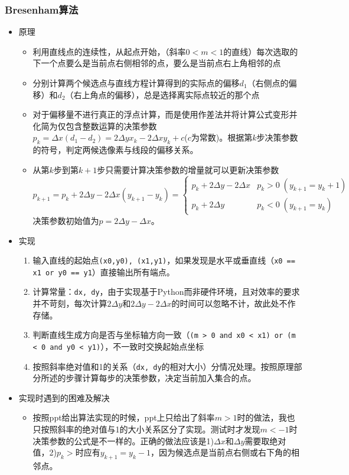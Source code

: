 \documentclass[a4paper,UTF8]{article}
\theoremstyle{definition}
\begin{document}
\subsubsection{Bresenham算法}
\begin{itemize}
  \item 原理
  \begin{itemize}
    \item 利用直线点的连续性，从起点开始，（斜率$0<m<1$的直线）每次选取的下一个点要么是当前点右侧相邻的点，要么是当前点右上角相邻的点
    \item 分别计算两个候选点与直线方程计算得到的实际点的偏移$d_1$（右侧点的偏移）和$d_2$（右上角点的偏移），总是选择离实际点较近的那个点
    \item 对于偏移量不进行真正的浮点计算，而是使用作差法并将计算公式变形并化简为仅包含整数运算的\textup{决策参数}$p_k=\Delta x(d_1-d_2)=2\Delta yx_k-2\Delta xy_k+c$($c$为常数)。根据第$k$步决策参数的符号，判定两候选像素与线段的偏移关系。
    \item 从第$k$步到第$k+1$步只需要计算决策参数的增量就可以更新决策参数
    $$p_{k+1}=p_{k}+2\Delta y-2\Delta x(y_{k+1}-y_k)=
    \begin{cases}
    p_k+2\Delta y-2\Delta x &p_k>0\;(y_{k+1}=y_k+1)\\
    p_k+2\Delta y & p_k<0\;(y_{k+1}=y_k)
    \end{cases}$$
    决策参数初始值为$p=2\Delta y-\Delta x$。
  \end{itemize}
  \item 实现 \cite{rog_2002}
  \begin{enumerate}
    \item 输入直线的起始点\texttt{(x0,y0), (x1,y1)}，如果发现是水平或垂直线（\texttt{x0 == x1 or y0 == y1}）直接输出所有端点。
    \item 计算常量：\texttt{dx, dy}，由于实现基于Python而非硬件环境，且对效率的要求并不苛刻，每次计算$2\Delta y$和$2\Delta y-2\Delta x$的时间可以忽略不计，故此处不作存储。
    \item 判断直线生成方向是否与坐标轴方向一致（\texttt{(m > 0 and x0 < x1) or (m < 0 and y0 < y1)}），不一致时交换起始点坐标
    \item 按照斜率绝对值和1的关系（\texttt{dx, dy}的相对大小）分情况处理。按照原理部分所述的步骤计算每步的决策参数，决定当前加入集合的点。
  \end{enumerate}
  \item 实现时遇到的困难及解决
  \begin{itemize}
    \item 按照ppt给出算法实现的时候，ppt上只给出了斜率$m>1$时的做法，我也只按照斜率的绝对值与1的大小关系区分了实现。测试时才发现$m<-1$时决策参数的公式是不一样的。正确的做法应该是1)$\Delta x$和$\Delta y$需要取绝对值，2)$p_k>$时应有$y_{k+1}=y_k-1$，因为候选点是当前点右侧或右下角的相邻点。

\end{itemize}
\end{itemize}
\end{document}

